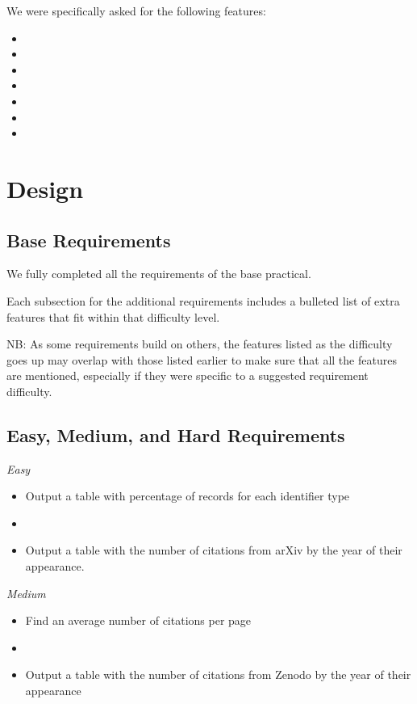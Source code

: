 \documentclass[12pt,a4paper,final]{article}
\begin{document}
We were specifically asked for the following features:

\begin{itemize}[noitemsep]
	\item
    \item
    \item
    \item
    \item
    \item
    \item
\end{itemize}

\section*{Design}

\subsection*{Base Requirements}

We fully completed all the requirements of the base practical.

Each subsection for the additional requirements includes a bulleted list of
extra features that fit within that difficulty level.

NB: As some requirements build on others, the features listed as the difficulty goes
up may overlap with those listed earlier to make sure that all the features are mentioned,
especially if they were specific to a suggested requirement difficulty.

\subsection*{Easy, Medium, and Hard Requirements}
\begin{center} \emph{Easy} \end{center}
\begin{itemize}[noitemsep]
    \item Output a table with percentage of records for each identifier type
    \item
    \item Output a table with the number of citations from arXiv by the year of their appearance.
\end{itemize}

\begin{center} \emph{Medium} \end{center}
\begin{itemize}[noitemsep]
    \item Find an average number of citations per page
    \item
    \item Output a table with the number of citations from Zenodo by the year of their appearance
\end{itemize}
\end{document}
